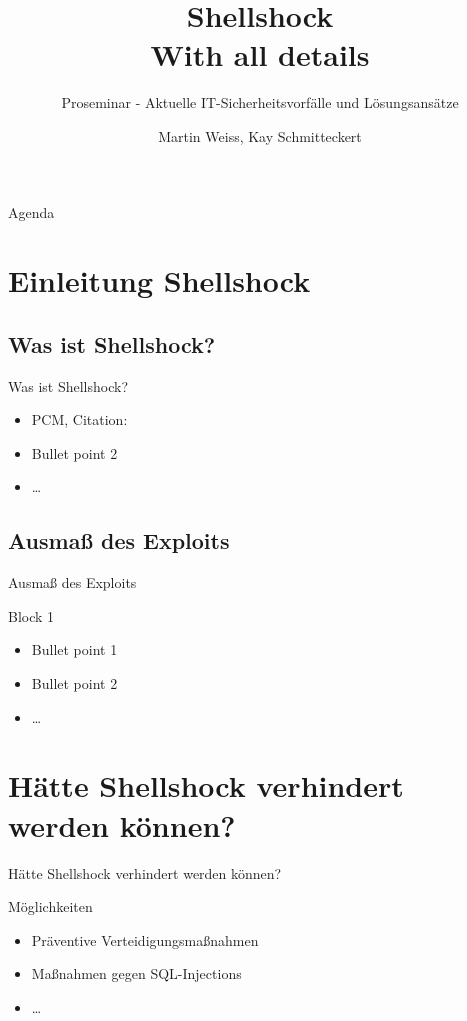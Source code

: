 \documentclass[18pt]{beamer}
\title[Short title]{Shellshock\\ With all details}
\subtitle{Proseminar - Aktuelle IT-Sicherheitsvorfälle und Lösungsansätze}
\author{Martin Weiss, Kay Schmitteckert}
\institute{Chair for Software Design and Quality}
\begin{document}

\begin{frame}
\titlepage
\end{frame}

\begin{frame}{Agenda}
\tableofcontents
\end{frame}

\section{Einleitung Shellshock}

\subsection{Was ist Shellshock?}
\begin{frame}{Was ist Shellshock?}
\begin{itemize}
\item PCM, Citation: \cite{becker2008a} %
\pause
\item Bullet point 2
\item \dots
\end{itemize}
\end{frame}

\subsection{Ausmaß des Exploits}
\begin{frame}{Ausmaß des Exploits}
\begin{block}{Block 1}
\begin{itemize}
\item Bullet point 1
\pause
\item Bullet point 2
\item \dots
\end{itemize}
\end{block}
\end{frame}

\section{Hätte Shellshock verhindert werden können?}
\begin{frame}{Hätte Shellshock verhindert werden können?}
\begin{exampleblock}{Möglichkeiten}
\begin{itemize}
\item Präventive Verteidigungsmaßnahmen
\pause
\item Maßnahmen gegen SQL-Injections
\item \dots
\end{itemize}
\end{exampleblock}
\end{frame}
\end{document}
